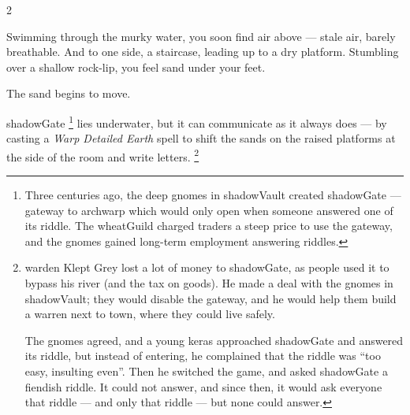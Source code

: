 \begin{multicols}{2}


\begin{boxtext}
  Swimming through the murky water, you soon find air above --- stale air, barely breathable.
  And to one side, a staircase, leading up to a dry platform.
  Stumbling over a shallow rock-lip, you feel sand under your feet.

  The sand begins to move.
\end{boxtext}


%


\Gls{shadowGate}%
\footnote{Three centuries ago, the \gls{deep} gnomes in \gls{shadowVault} created \gls{shadowGate} ---  gateway to \gls{archwarp} which would only open when someone answered one of its riddle.
The \gls{wheatGuild} charged traders a steep price to use the gateway, and the gnomes gained long-term employment answering riddles.}
lies underwater, but it can communicate as it always does --- by casting a \textit{Warp Detailed Earth} \gls{spell} to shift the sands on the raised platforms at the side of the room and write letters.%
\footnote{\Gls{warden} Klept Grey lost a lot of money to \gls{shadowGate}, as people used it to bypass his river (and the tax on goods).
He made a deal with the gnomes in \gls{shadowVault}; they would disable the gateway, and he would help them build a warren next to \gls{town}, where they could live safely.

The gnomes agreed, and a young \gls{keras} approached \gls{shadowGate} and answered its riddle, but instead of entering, he complained that the riddle was ``too easy, insulting even''.
Then he switched the game, and asked \gls{shadowGate} a fiendish riddle.
It could not answer, and since then, it would ask everyone that riddle --- and only that riddle --- but none could answer.}


\end{multicols}
